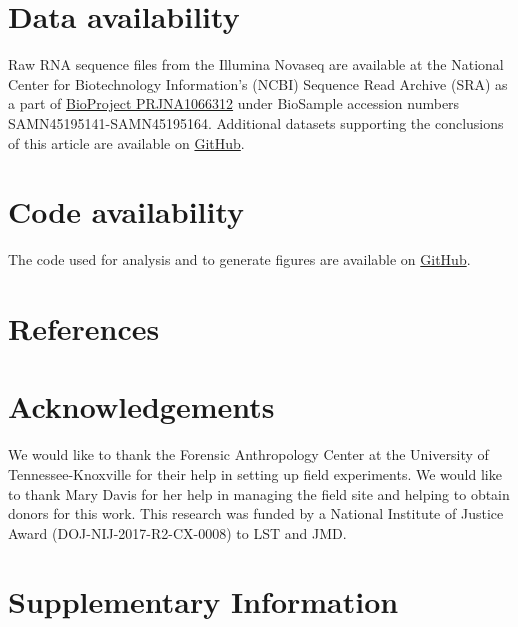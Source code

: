 \documentclass[
  sn-nature,
  lineno, referee]{sn-jnl}
\begin{document}
\section{Data availability}\label{data-availability}

Raw RNA sequence files from the Illumina Novaseq are available at the
National Center for Biotechnology Information's (NCBI) Sequence Read
Archive (SRA) as a part of
\href{https://www.ncbi.nlm.nih.gov/bioproject/PRJNA1066312/}{BioProject
PRJNA1066312} under BioSample accession numbers
SAMN45195141-SAMN45195164. Additional datasets supporting the
conclusions of this article are available on
\href{https://github.com/amason30/Mason_MetaT_XXX_2024}{GitHub}.

\section{Code availability}\label{code-availability}

The code used for analysis and to generate figures are available on
\href{https://github.com/amason30/Mason_MetaT_XXX_2024}{GitHub}.

\section{References}\label{references}

\renewcommand{\bibsection}{}


\section{Acknowledgements}\label{acknowledgements}

We would like to thank the Forensic Anthropology Center at the
University of Tennessee-Knoxville for their help in setting up field
experiments. We would like to thank Mary Davis for her help in managing
the field site and helping to obtain donors for this work. This research
was funded by a National Institute of Justice Award
(DOJ-NIJ-2017-R2-CX-0008) to LST and JMD.

\section*{Supplementary Information}\label{supplementary-information}
\end{document}
